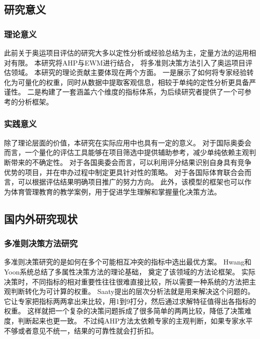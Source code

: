 \documentclass[twoside]{CUGThesis}
\begin{document}
\subsection{研究意义}

\subsubsection{理论意义}

此前关于奥运项目评估的研究大多以定性分析或经验总结为主，定量方法的运用相对有限。
本研究将AHP与EWM进行结合\cite{Zhang2023,Liang2023}，
将多准则决策方法引入了奥运项目评估领域。
本研究的理论贡献主要体现在两个方面。
一是展示了如何将专家经验转化为可量化的权重，同时从数据中提取客观信息，相较于单纯的定性分析更具备严谨性。
二是构建了一套涵盖六个维度的指标体系，为后续研究者提供了一个可参考的分析框架。

\subsubsection{实践意义}

除了理论层面的价值，本研究在实际应用中也具有一定的意义。
对于国际奥委会而言，一个量化的评估工具能够在项目筛选中提供辅助参考，减少单纯依赖主观判断带来的不确定性。
对于各国奥委会而言，可以利用评分结果识别自身具有竞争优势的项目，并在申办过程中制定更具针对性的策略。
对于各国际体育联合会而言，可以根据评估结果明确项目推广的努力方向。
此外，该模型的框架也可以作为体育管理教育的教学案例，用于促进学生理解和掌握量化决策方法。

\subsection{国内外研究现状}

\subsubsection{多准则决策方法研究}

多准则决策研究的是如何在多个可能相互冲突的指标中选出最优方案。
Hwang和Yoon\cite{Hwang1981}系统总结了多属性决策方法的理论基础，
奠定了该领域的方法论框架。
实际决策时，不同指标的相对重要性往往很难直接比较，所以需要一种系统的方法把主观判断转化为可计算的权重。
Saaty\cite{Saaty2007}提出的层次分析法就是用来解决这个问题的。
它让专家把指标两两拿出来比较，用1到9打分，然后通过求解特征值得出各指标的权重。
这样就把一个复杂的决策问题拆成了很多简单的两两比较，降低了决策难度，判断起来也更一致。
不过纯AHP方法太依赖专家的主观判断，如果专家水平不够或者意见不统一，结果的可靠性就会打折扣。
\end{document}
